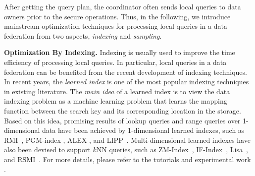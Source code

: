 \documentclass[11pt]{article}
\newcommand{\fakeparagraph}[1]{\vspace{1mm}\noindent\textbf{#1.}}
\begin{document}
After getting the query plan, the coordinator often sends local queries to data owners prior to the secure operations.
Thus, in the following, we introduce mainstream optimization techniques for processing local queries in a data federation from two aspects, \textit{indexing} and \textit{sampling}.

\fakeparagraph{Optimization By Indexing}
Indexing is usually used to improve the time efficiency of processing local queries.
In particular, local queries in a data federation can be benefited from the recent development of indexing techniques.
In recent years, the \textit{learned index} is one of the most popular indexing techniques in existing literature.
The \textit{main idea} of a learned index is to view the data indexing problem as a machine learning problem that learns the mapping function between the search key and its corresponding location in the storage.
Based on this idea, promising results of lookup queries and range queries over 1-dimensional data have been achieved by 1-dimensional learned indexes, such as RMI~\cite{Yongxin-DBLP:conf/sigmod/KraskaBCDP18}, PGM-index \cite{Yongxin-DBLP:journals/pvldb/FerraginaV20}, ALEX \cite{Yongxin-DBLP:conf/sigmod/DingMYWDLZCGKLK20}, and LIPP~\cite{Yongxin-DBLP:journals/pvldb/WuZCCWX21}.
Multi-dimensional learned indexes have also been devised to support $k$NN queries, such as ZM-Index~\cite{Yongxin-DBLP:conf/mdm/WangFX019}, IF-Index~\cite{Yongxin-DBLP:conf/vldb/0001KH20}, Lisa~\cite{Yongxin-DBLP:conf/sigmod/Li0ZY020}, and RSMI~\cite{Yongxin-DBLP:journals/pvldb/QiLJK20}.
For more details, please refer to the tutorials \cite{Yongxin-DBLP:conf/sigmod/IdreosK19} and experimental work \cite{Yongxin-DBLP:journals/pvldb/MarcusKRSMK0K20}.
\end{document}

